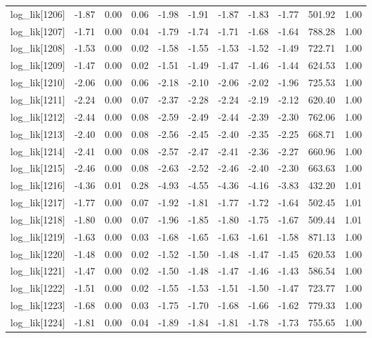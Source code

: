 \begin{table}[ht]
\begin{tabular}{rrrrrrrrrrr}
  log\_lik[1206] & -1.87 & 0.00 & 0.06 & -1.98 & -1.91 & -1.87 & -1.83 & -1.77 & 501.92 & 1.00 \\ 
  log\_lik[1207] & -1.71 & 0.00 & 0.04 & -1.79 & -1.74 & -1.71 & -1.68 & -1.64 & 788.28 & 1.00 \\ 
  log\_lik[1208] & -1.53 & 0.00 & 0.02 & -1.58 & -1.55 & -1.53 & -1.52 & -1.49 & 722.71 & 1.00 \\ 
  log\_lik[1209] & -1.47 & 0.00 & 0.02 & -1.51 & -1.49 & -1.47 & -1.46 & -1.44 & 624.53 & 1.00 \\ 
  log\_lik[1210] & -2.06 & 0.00 & 0.06 & -2.18 & -2.10 & -2.06 & -2.02 & -1.96 & 725.53 & 1.00 \\ 
  log\_lik[1211] & -2.24 & 0.00 & 0.07 & -2.37 & -2.28 & -2.24 & -2.19 & -2.12 & 620.40 & 1.00 \\ 
  log\_lik[1212] & -2.44 & 0.00 & 0.08 & -2.59 & -2.49 & -2.44 & -2.39 & -2.30 & 762.06 & 1.00 \\ 
  log\_lik[1213] & -2.40 & 0.00 & 0.08 & -2.56 & -2.45 & -2.40 & -2.35 & -2.25 & 668.71 & 1.00 \\ 
  log\_lik[1214] & -2.41 & 0.00 & 0.08 & -2.57 & -2.47 & -2.41 & -2.36 & -2.27 & 660.96 & 1.00 \\ 
  log\_lik[1215] & -2.46 & 0.00 & 0.08 & -2.63 & -2.52 & -2.46 & -2.40 & -2.30 & 663.63 & 1.00 \\ 
  log\_lik[1216] & -4.36 & 0.01 & 0.28 & -4.93 & -4.55 & -4.36 & -4.16 & -3.83 & 432.20 & 1.01 \\ 
  log\_lik[1217] & -1.77 & 0.00 & 0.07 & -1.92 & -1.81 & -1.77 & -1.72 & -1.64 & 502.45 & 1.01 \\ 
  log\_lik[1218] & -1.80 & 0.00 & 0.07 & -1.96 & -1.85 & -1.80 & -1.75 & -1.67 & 509.44 & 1.01 \\ 
  log\_lik[1219] & -1.63 & 0.00 & 0.03 & -1.68 & -1.65 & -1.63 & -1.61 & -1.58 & 871.13 & 1.00 \\ 
  log\_lik[1220] & -1.48 & 0.00 & 0.02 & -1.52 & -1.50 & -1.48 & -1.47 & -1.45 & 620.53 & 1.00 \\ 
  log\_lik[1221] & -1.47 & 0.00 & 0.02 & -1.50 & -1.48 & -1.47 & -1.46 & -1.43 & 586.54 & 1.00 \\ 
  log\_lik[1222] & -1.51 & 0.00 & 0.02 & -1.55 & -1.53 & -1.51 & -1.50 & -1.47 & 723.77 & 1.00 \\ 
  log\_lik[1223] & -1.68 & 0.00 & 0.03 & -1.75 & -1.70 & -1.68 & -1.66 & -1.62 & 779.33 & 1.00 \\ 
  log\_lik[1224] & -1.81 & 0.00 & 0.04 & -1.89 & -1.84 & -1.81 & -1.78 & -1.73 & 755.65 & 1.00 \\ 

\end{tabular}
\end{table}
